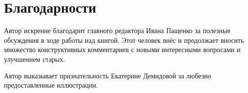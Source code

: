 \chapter*{Благодарности}
Автор искренне благодарит главного редактора Ивана Пащенко за полезные обсуждения в ходе работы над книгой. Этот человек внёс и продолжает вносить множество конструктивных комментариев с новыми интересными вопросами и улучшением старых.

Автор выказывает признательность Екатерине Демидовой за любезно предоставленные иллюстрации.